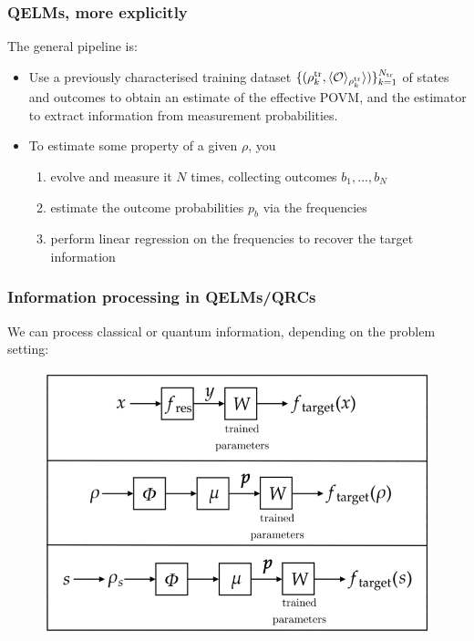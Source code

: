 \documentclass{beamer}
\begin{document}
\begin{frame}
\frametitle{QELMs, more explicitly}

The general pipeline is:\vspace{10pt}
\begin{itemize}
    \item Use a previously characterised training dataset $\{(\rho_k^{\rm tr},\langle\mathcal O\rangle_{\rho_k^{\rm tr}}\rangle)\}_{k=1}^{N_{\rm tr}}$ of states and outcomes to obtain an estimate of the effective POVM, and the estimator to extract information from measurement probabilities.
    \vspace{10pt}
    \item To estimate some property of a given $\rho$, you
    \begin{enumerate}
        \item evolve and measure it $N$ times, collecting outcomes $b_1,...,b_N$
        \item estimate the outcome probabilities $p_b$ via the frequencies 
        \item perform linear regression on the frequencies to recover the target information
    \end{enumerate}
\end{itemize}
    
\end{frame}

\begin{frame}
\frametitle{Information processing in QELMs/QRCs}
We can process classical or quantum information, depending on the problem setting:
\begin{figure}
\includegraphics[width=0.7\linewidth]{figures/QRCs processing info.png}
\end{figure}

\end{frame}
\end{document}
